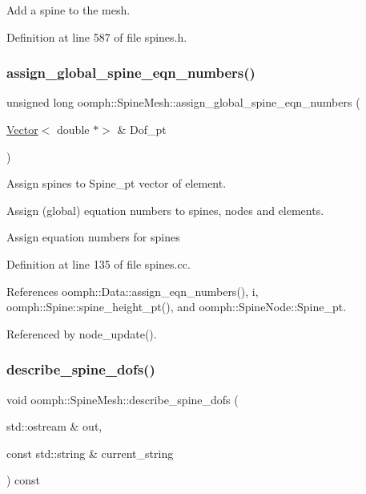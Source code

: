 Add a spine to the mesh. 



Definition at line 587 of file spines.\+h.

\mbox{\label{classoomph_1_1SpineMesh_ad743e349d74b24cc0e79fb4579229f13}} 
\subsubsection{\texorpdfstring{assign\+\_\+global\+\_\+spine\+\_\+eqn\+\_\+numbers()}{assign\_global\_spine\_eqn\_numbers()}}
{\footnotesize\ttfamily unsigned long oomph\+::\+Spine\+Mesh\+::assign\+\_\+global\+\_\+spine\+\_\+eqn\+\_\+numbers (\begin{DoxyParamCaption}\item[{\hyperlink{classoomph_1_1Vector}{Vector}$<$ double $\ast$$>$ \&}]{Dof\+\_\+pt }\end{DoxyParamCaption})}



Assign spines to Spine\+\_\+pt vector of element. 

Assign (global) equation numbers to spines, nodes and elements.

Assign equation numbers for spines 

Definition at line 135 of file spines.\+cc.



References oomph\+::\+Data\+::assign\+\_\+eqn\+\_\+numbers(), i, oomph\+::\+Spine\+::spine\+\_\+height\+\_\+pt(), and oomph\+::\+Spine\+Node\+::\+Spine\+\_\+pt.



Referenced by node\+\_\+update().

\mbox{\label{classoomph_1_1SpineMesh_a94766043ec96db8388476b62556bad16}} 
\subsubsection{\texorpdfstring{describe\+\_\+spine\+\_\+dofs()}{describe\_spine\_dofs()}}
{\footnotesize\ttfamily void oomph\+::\+Spine\+Mesh\+::describe\+\_\+spine\+\_\+dofs (\begin{DoxyParamCaption}\item[{std\+::ostream \&}]{out,  }\item[{const std\+::string \&}]{current\+\_\+string }\end{DoxyParamCaption}) const}



